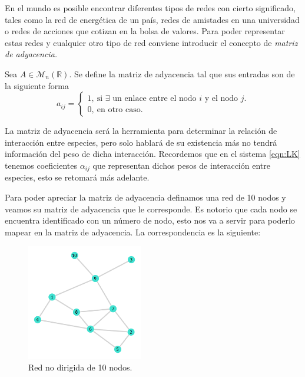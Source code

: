 En el mundo es posible encontrar diferentes tipos de redes con cierto significado, tales como la red de energética de un país, redes de amistades en una universidad o redes de acciones que cotizan en la bolsa de valores. Para poder representar estas redes y cualquier otro tipo de red conviene introducir el concepto de \textit{matriz de adyacencia.}
\begin{definición}\label{def:1}
	Sea $A\in\mathcal{M}_n(\mathbb{R}) $. Se define la matriz de adyacencia tal que sus entradas son de la siguiente forma
	$$a_{ij}= 
	\begin{cases}
		1, \ \text{si $\exists$ un enlace entre el nodo $i$ y el nodo $j$.}\\
		0, \ \text{en otro caso}.
	\end{cases}$$
\end{definición}
La matriz de adyacencia será la herramienta para determinar la relación de interacción entre especies, pero solo hablará de su existencia más no tendrá información del peso de dicha interacción. Recordemos que en el sistema \ref{eqn:LK} tenemos coeficientes $\alpha_{ij}$ que representan dichos pesos de interacción entre especies, esto se retomará más adelante. 
\begin{ejemplo}
	Para poder apreciar la matriz de adyacencia definamos una red de 10 nodos y veamos su matriz de adyacencia que le corresponde. Es notorio que cada nodo se encuentra identificado con un número de nodo, esto nos va a servir  para poderlo mapear en la matriz de adyacencia. La correspondencia es la siguiente:
\end{ejemplo}
\begin{figure} \vspace{-30pt} \begin{center}
		\includegraphics[width=0.45\textwidth]{../Imagenes/Red10} 
	\end{center} 
	\vspace{-20pt} 
	\caption{Red no dirigida de 10 nodos.} 
	\vspace{-120pt}
	\label{fig:Red10}
\end{figure} 

